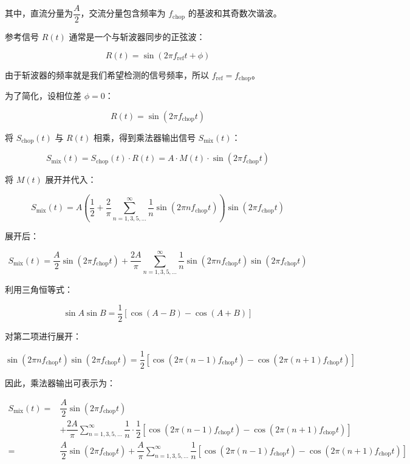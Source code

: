 其中，直流分量为\( \dfrac{A}{2} \)，交流分量包含频率为 \( f_{\text{chop}} \) 的基波和其奇数次谐波。

参考信号 \( R(t) \) 通常是一个与斩波器同步的正弦波：

\[
R(t) = \sin(2\pi f_{\text{ref}} t + \phi)
\]

由于斩波器的频率就是我们希望检测的信号频率，所以 \( f_{\text{ref}} = f_{\text{chop}} \)。

为了简化，设相位差 \( \phi = 0 \)：

\[
R(t) = \sin(2\pi f_{\text{chop}} t)
\]

将 \( S_{\text{chop}}(t) \) 与 \( R(t) \) 相乘，得到乘法器输出信号 \( S_{\text{mix}}(t) \)：

\[
S_{\text{mix}}(t) = S_{\text{chop}}(t) \cdot R(t) = A \cdot M(t) \cdot \sin(2\pi f_{\text{chop}} t)
\]

将 \( M(t) \) 展开并代入：

\[
S_{\text{mix}}(t) = A \left( \dfrac{1}{2} + \dfrac{2}{\pi} \sum_{n=1,3,5,\dots}^{\infty} \dfrac{1}{n} \sin(2\pi n f_{\text{chop}} t) \right) \sin(2\pi f_{\text{chop}} t)
\]

展开后：

\[
S_{\text{mix}}(t) = \dfrac{A}{2} \sin(2\pi f_{\text{chop}} t) + \dfrac{2A}{\pi} \sum_{n=1,3,5,\dots}^{\infty} \dfrac{1}{n} \sin(2\pi n f_{\text{chop}} t) \sin(2\pi f_{\text{chop}} t)
\]

利用三角恒等式：

\[
\sin A \sin B = \dfrac{1}{2} [\cos(A - B) - \cos(A + B)]
\]

对第二项进行展开：

\[
\sin(2\pi n f_{\text{chop}} t) \sin(2\pi f_{\text{chop}} t) = \dfrac{1}{2} \left[ \cos(2\pi (n - 1) f_{\text{chop}} t) - \cos(2\pi (n + 1) f_{\text{chop}} t) \right]
\]

因此，乘法器输出可表示为：

\[
\begin{aligned}
	S_{\text{mix}}(t) = & \dfrac{A}{2} \sin(2\pi f_{\text{chop}} t) \\
	& + \dfrac{2A}{\pi} \sum_{n=1,3,5,\dots}^{\infty} \dfrac{1}{n} \cdot \dfrac{1}{2} \left[ \cos(2\pi (n - 1) f_{\text{chop}} t) - \cos(2\pi (n + 1) f_{\text{chop}} t) \right] \\
	= & \dfrac{A}{2} \sin(2\pi f_{\text{chop}} t) + \dfrac{A}{\pi} \sum_{n=1,3,5,\dots}^{\infty} \dfrac{1}{n} \left[ \cos(2\pi (n - 1) f_{\text{chop}} t) - \cos(2\pi (n + 1) f_{\text{chop}} t) \right]
\end{aligned}
\]

